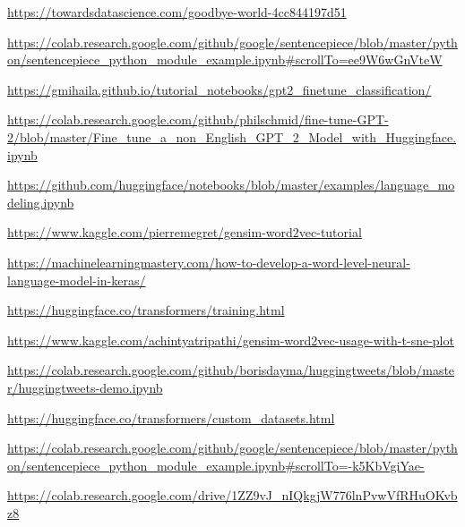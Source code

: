 \documentclass[12pt, a4paper]{article}
\begin{document}
\begin{thebibliography}{9}
	\url{https://towardsdatascience.com/goodbye-world-4cc844197d51}
	
	\url{https://colab.research.google.com/github/google/sentencepiece/blob/master/python/sentencepiece_python_module_example.ipynb#scrollTo=ee9W6wGnVteW}
	
	\url{https://gmihaila.github.io/tutorial_notebooks/gpt2_finetune_classification/}
	
	\url{https://colab.research.google.com/github/philschmid/fine-tune-GPT-2/blob/master/Fine_tune_a_non_English_GPT_2_Model_with_Huggingface.ipynb}
	
	\url{https://github.com/huggingface/notebooks/blob/master/examples/language_modeling.ipynb}
	
	\url{https://www.kaggle.com/pierremegret/gensim-word2vec-tutorial}
	
	\url{https://machinelearningmastery.com/how-to-develop-a-word-level-neural-language-model-in-keras/}
	
	\url{https://huggingface.co/transformers/training.html}
	
	\url{https://www.kaggle.com/achintyatripathi/gensim-word2vec-usage-with-t-sne-plot}
	
	\url{https://colab.research.google.com/github/borisdayma/huggingtweets/blob/master/huggingtweets-demo.ipynb}
	
	\url{https://huggingface.co/transformers/custom_datasets.html}
	
	\url{https://colab.research.google.com/github/google/sentencepiece/blob/master/python/sentencepiece_python_module_example.ipynb#scrollTo=-k5KbVgiYae-}
	
	\url{https://colab.research.google.com/drive/1ZZ9vJ_nIQkgjW776lnPvwVfRHuOKvbz8}
	
\end{thebibliography}
\end{document}
